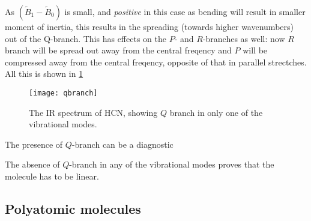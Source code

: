 As $(\widetilde{B}_1-\widetilde{B}_0)$ is small, and \emph{positive} in this case as bending will result in smaller moment of inertia, this results in the spreading (towards higher wavenumbers) out of the Q-branch. This has effects on the $P$- and $R$-branches as well: now $R$ branch will be spread out away from the central freqency and $P$ will be compressed away from the central freqency, opposite of that in parallel strectches. All this is shown in \cref{fig:qbranch}
\begin{figure}[H]
	\texttt{[image: qbranch]}
	\centering
	\caption{The IR spectrum of HCN, showing $Q$ branch in only one of the vibrational modes.}
	\label{fig:qbranch}
\end{figure}
The presence of $Q$-branch can be a diagnostic
\begin{prt}
The absence of $Q$-branch in any of the vibrational modes proves that the molecule has to be linear.
\end{prt}
\subsection{Polyatomic molecules}
\label{polyvib}
